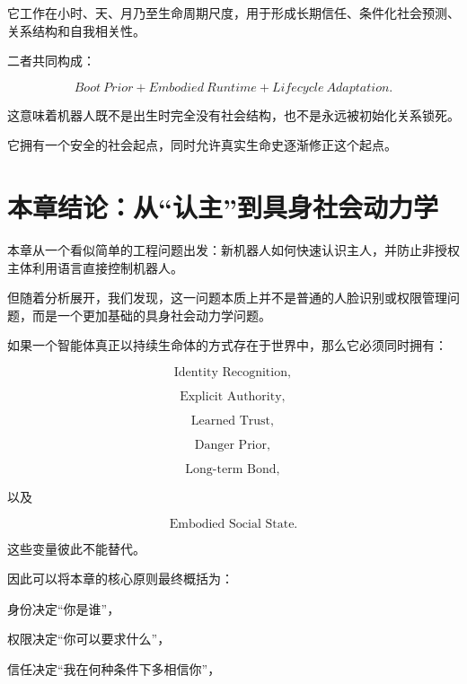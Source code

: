 \begin{statementbox}
\centering
{}
\end{statementbox}

它工作在小时、天、月乃至生命周期尺度，用于形成长期信任、条件化社会预测、关系结构和自我相关性。

二者共同构成：

\[
\boxed{
Boot\ Prior
+
Embodied\ Runtime
+
Lifecycle\ Adaptation.
}
\]

这意味着机器人既不是出生时完全没有社会结构，也不是永远被初始化关系锁死。

它拥有一个安全的社会起点，同时允许真实生命史逐渐修正这个起点。


\section{本章结论：从“认主”到具身社会动力学}

本章从一个看似简单的工程问题出发：新机器人如何快速认识主人，并防止非授权主体利用语言直接控制机器人。

但随着分析展开，我们发现，这一问题本质上并不是普通的人脸识别或权限管理问题，而是一个更加基础的具身社会动力学问题。

如果一个智能体真正以持续生命体的方式存在于世界中，那么它必须同时拥有：

\[
\text{Identity Recognition},
\]

\[
\text{Explicit Authority},
\]

\[
\text{Learned Trust},
\]

\[
\text{Danger Prior},
\]

\[
\text{Long-term Bond},
\]

以及

\[
\text{Embodied Social State}.
\]

这些变量彼此不能替代。

因此可以将本章的核心原则最终概括为：

\begin{proposition*}
身份决定“你是谁”，
\end{proposition*}

\begin{statementbox}
权限决定“你可以要求什么”，
\end{statementbox}

\begin{statementbox}
信任决定“我在何种条件下多相信你”，
\end{statementbox}


